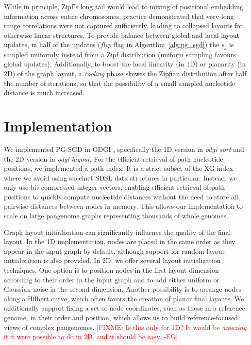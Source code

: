 \documentclass{bioinfo}
\theoremstyle{definition}
\newcommand{\red}[1]{{\textcolor{Red}{#1}}}
\newcommand{\FIXME}[1]{\red{[FIXME: #1]}}
\begin{document}
    While in principle, Zipf's long tail would lead to mixing of positional embedding information across entire chromosomes, practice demonstrated that very long range correlations were not captured sufficiently, leading to collapsed layouts for otherwise linear structures.
    To provide balance between global and local layout updates, in half of the updates ($flip$ flag in Algorithm~\ref{alg:pg_sgd}) the $s_j$ is sampled uniformly instead from a Zipf distribution (uniform sampling favours global updates).
	Additionally, to boost the local linearity (in 1D) or planarity (in 2D) of the graph layout, a \textit{cooling} phase skewes the Zipfian distribution after half the number of iterations, so that the possibility of a small sampled nucleotide distance is much increased. 

	\section{Implementation}
	
	We implemented PG-SGD in ODGI \citep{Guarracino2022}, specifically the 1D version in \textit{odgi sort} and the 2D version in \textit{odgi layout}. %
	For the efficient retrieval of path nucleotide positions, we implemented a path index. 
	It is a strict subset of the XG index~\citep{Garrison:2018} where we avoid using succinct SDSL data structures \citep{Gog2014} in particular.
	Instead, we only use bit compressed integer vectors, enabling efficient retrieval of path positions to quickly compute nucleotide distances without the need to store all pairwise distances between nodes in memory.
	This allows our implementation to scale on large pangenome graphs representing thousands of whole genomes.

	Graph layout initialization can significantly influence the quality of the final layout.
	In the 1D implementation, nodes are placed in the same order as they appear in the input graph by default, although support for random layout initialization is also provided.
	In 2D, we offer several layout initialization techniques.
	One option is to position nodes in the first layout dimension according to their order in the input graph and to add either uniform or Gaussian noise in the second dimension.
	Another possibility is to arrange nodes along a Hilbert curve, which often favors the creation of planar final layouts.
    We additionally support fixing a set of node coordinates, such as those in a reference genome, in their order and position, which allows us to build reference-focused views of complex pangenomes. \FIXME{Is this only for 1D? It would be \textit{amazing} if it were possible to do in 2D, and it should be easy. -EG}
\end{document}
